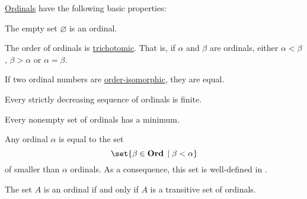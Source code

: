 \begin{proposition}\label{thm:ordinal_properties}
  \hyperref[def:ordinal]{Ordinals} have the following basic properties:
  \begin{thmenum}
     The empty set \( \varnothing \) is an ordinal.

     The order of ordinals is \hyperref[def:binary_relation/trichotomic]{trichotomic}. That is, if \( \alpha \) and \( \beta \) are ordinals, either \( \alpha < \beta \), \( \beta > \alpha \) or \( \alpha = \beta \).

     If two ordinal numbers are \hyperref[def:poset/homomorphism]{order-isomorphic}, they are equal.

     Every strictly decreasing sequence of ordinals is finite.

     Every nonempty set of ordinals has a minimum.

     Any ordinal \( \alpha \) is equal to the set
    \begin{equation}\label{eq:thm:ordinal_properties/set_of_smaller_ordinals}
      \set{ \beta \in \cat{Ord} \given \beta < \alpha }
    \end{equation}
    of smaller than \( \alpha \) ordinals. As a consequence, this set is well-defined in .

     The set \( A \) is an ordinal if and only if \( A \) is a transitive set of ordinals.
  \end{thmenum}
\end{proposition}
